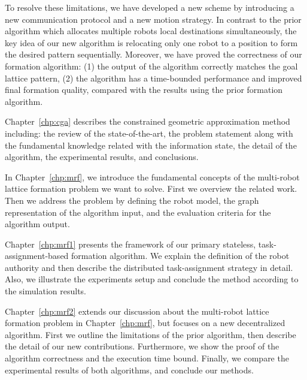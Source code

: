 To resolve these limitations, we have developed a new scheme by introducing a new communication protocol and a new motion strategy. 
In contrast to the prior algorithm which allocates multiple robots local destinations simultaneously,
the key idea of our new algorithm is relocating only one robot to a position to form the desired pattern sequentially.
Moreover, we have proved the correctness of our formation algorithm: (1) the
output of the algorithm correctly matches the goal lattice pattern, (2) the
algorithm has a time-bounded performance and improved final formation quality, 
compared with the results using the prior formation algorithm.

Chapter~\ref{chp:cga} describes the constrained geometric approximation method 
including: the review of the state-of-the-art,
the problem statement along with the fundamental knowledge related with the
information state, the detail of the algorithm, the experimental results, and conclusions.

In Chapter~\ref{chp:mrf}, we introduce the fundamental concepts of the multi-robot lattice formation problem we want to solve. 
% 
First we overview the related work. 
%
Then we address the problem by defining the robot model, the graph representation of the algorithm input, and the evaluation criteria for the algorithm output. 

Chapter~\ref{chp:mrf1} presents the framework of our primary stateless, task-assignment-based formation algorithm. 
%
We explain the definition of the robot authority and then describe the distributed task-assignment strategy in detail.
%
Also, we illustrate the experiments setup and conclude the method according to the simulation results.

Chapter~\ref{chp:mrf2} extends our discussion about the multi-robot lattice formation problem in Chapter~\ref{chp:mrf}, but focuses on a new decentralized algorithm. 
First we outline the limitations of the prior algorithm, then describe the detail of our new contributions.
Furthermore, we show the proof of the algorithm correctness and the execution time bound.
Finally, we compare the experimental results of both algorithms, and conclude our methods.